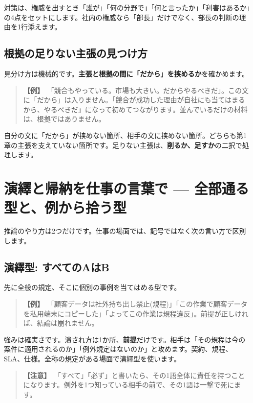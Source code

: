 \documentclass{article}
\begin{document}
対策は、権威を出すとき「誰が」「何の分野で」「何と言ったか」「利害はあるか」の4点をセットにします。社内の権威なら「部長」だけでなく、部長の判断の理由を1行添えます。

\subsection{根拠の足りない主張の見つけ方}

見分け方は機械的です。\textbf{主張と根拠の間に「だから」を挟めるか}を確かめます。

\begin{quote}
\textbf{【例】}\ 「競合もやっている。市場も大きい。だからやるべきだ」。この文に「だから」は入りません。「競合が成功した理由が自社にも当てはまるから、やるべきだ」になって初めてつながります。並んでいるだけの材料は、根拠ではありません。
\end{quote}

自分の文に「だから」が挟めない箇所、相手の文に挟めない箇所。どちらも第1章の主張を支えていない箇所です。足りない主張は、\textbf{削るか、足すか}の二択で処理します。

\section{演繹と帰納を仕事の言葉で — 全部通る型と、例から拾う型}

推論のやり方は2つだけです。仕事の場面では、記号ではなく次の言い方で区別します。

\subsection{演繹型: すべてのAはB}

先に全般の規定、そこに個別の事例を当てはめる型です。

\begin{quote}
\textbf{【例】}\ 「顧客データは社外持ち出し禁止(規程)」「この作業で顧客データを私用端末にコピーした」「よってこの作業は規程違反」。前提が正しければ、結論は崩れません。
\end{quote}

強みは確実さです。潰され方は1か所、\textbf{前提}だけです。相手は「その規程は今の案件に適用されるのか」「例外規定はないのか」と攻めます。契約、規程、SLA、仕様。全称の規定がある場面で演繹型を使います。

\begin{quote}
\textbf{【注意】}\ 「すべて」「必ず」と書いたら、その1語全体に責任を持つことになります。例外を1つ知っている相手の前で、その1語は一撃で死にます。
\end{quote}
\end{document}
